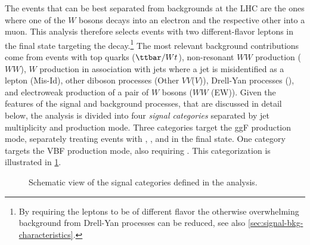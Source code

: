 The \HWW events that can be best separated from backgrounds at the LHC are the ones where one of the $W$ bosons decays into an electron and the respective other into a muon.
This analysis therefore selects events with two different-flavor leptons in the final state targeting the \HWWdet decay.\footnote{By requiring the leptons to be of different flavor the otherwise overwhelming background from Drell-Yan processes can be reduced, see also \cref{sec:signal-bkg-characteristics}.} 
The most relevant background contributions come from events with top quarks ($\ttbar/Wt$), non-resonant $WW$ production ($WW$), $W$ production in association with jets where a jet is misidentified as a lepton (Mis-Id), other diboson processes (Other $VV$($V$)), Drell-Yan processes (\Zgamma), and electroweak production of a pair of $W$ bosons ($WW$ (EW)). 
Given the features of the signal and background processes, that are discussed in detail below, the analysis is divided into four \emph{signal categories} separated by jet multiplicity and production mode.
Three categories target the ggF production mode, separately treating events with \ZeroJet, \OneJet, and \TwoJet in the final state. One category targets the VBF production mode, also requiring \TwoJet. 
This categorization is illustrated in \cref{fig:signal-categorization}.
\begin{figure}[ht]
    \caption{Schematic view of the signal categories defined in the \HWW analysis.}
    \label{fig:signal-categorization}
\end{figure}

